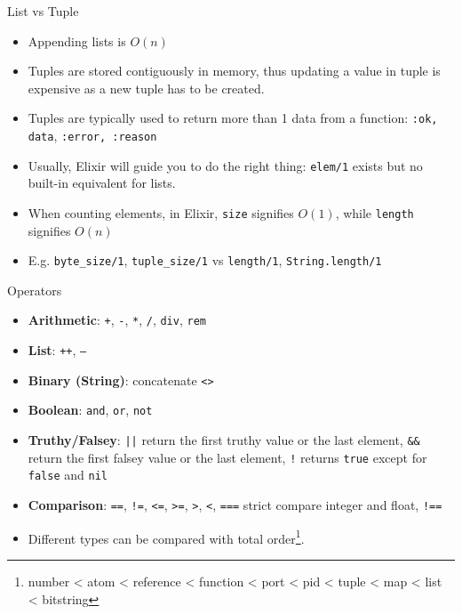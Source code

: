 \documentclass[12pt]{beamer}
\begin{document}
\begin{frame}{List vs Tuple}
  \begin{itemize}
    \item Appending lists is $O(n)$
    \item Tuples are stored contiguously in memory, thus updating a value in tuple is expensive as a new tuple has to be created.
    \item Tuples are typically used to return more than 1 data from a function: \texttt{{:ok, data}}, \texttt{{:error, :reason}}
    \item Usually, Elixir will guide you to do the right thing: \texttt{elem/1} exists but no built-in equivalent for lists.
    \item When counting elements, in Elixir, \texttt{size} signifies $O(1)$, while \texttt{length} signifies $O(n)$
    \item E.g. \texttt{byte_size/1}, \texttt{tuple_size/1} vs \texttt{length/1}, \texttt{String.length/1}
  \end{itemize}
\end{frame}

\begin{frame}{Operators}
  \begin{itemize}
    \item \textbf{Arithmetic}: \texttt{+}, \texttt{-}, \texttt{*}, \texttt{/}, \texttt{div}, \texttt{rem}
    \item \textbf{List}: \texttt{++}, \texttt{--}
    \item \textbf{Binary (String)}: concatenate \texttt{<>}
    \item \textbf{Boolean}: \texttt{and}, \texttt{or}, \texttt{not}
    \item \textbf{Truthy/Falsey}: \texttt{||} return the first truthy value or the last element, \texttt{&&} return the first falsey value or the last element, \texttt{!} returns \texttt{true} except for \texttt{false} and \texttt{nil}
    \item \textbf{Comparison}: \texttt{==}, \texttt{!=}, \texttt{<=}, \texttt{>=}, \texttt{>}, \texttt{<}, \texttt{===} strict compare integer and float, \texttt{!==}
    \item Different types can be compared with total order\footnote{number < atom < reference < function < port < pid < tuple < map < list < bitstring}.
  \end{itemize}
\end{frame}
\end{document}
